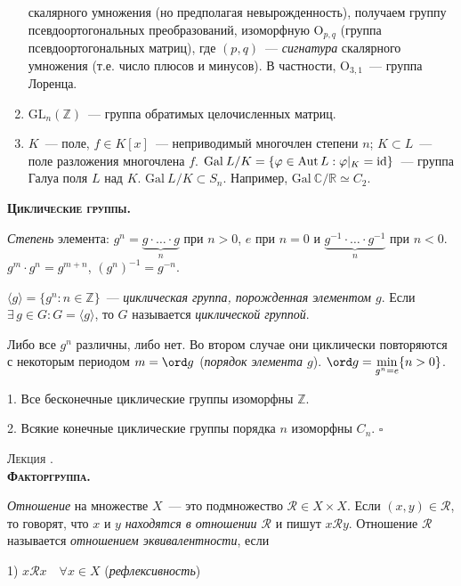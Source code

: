 \documentclass[a4paper]{article}
\newcounter{lec}
\renewcommand{\thelec}{\Roman{lec}}
\newcommand*{\lecture}[1]{\refstepcounter{lec}\vspace{20pt}
\begin{center}{\rmfamily\textsc{Лекция \thelec. \\ \textbf{#1}}}\vspace{5pt}
\end{center}}
\newcommand*{\tema}[1]{\vspace{20pt}
\begin{center}{\textbf{\textsc{#1.}}}\vspace{5pt}
\end{center}}
\renewcommand{\Aut}{\mathop{\mathrm{Aut}}\nolimits}
\newcommand*{\p}[1]{#1\nobreak\discretionary{}{\hbox{$\mathsurround=0pt #1$}}{}}
\begin{document}
\begin{ex}
\begin{enumerate}
  скалярного умножения (но предполагая невырожденность), получаем
  группу псевдоортогональных преобразований, изоморфную $\mathrm{O}_{p,q}$ (группа
  псевдоортогональных матриц), где $(p,q)$~--- \emph{сигнатура}
  скалярного умножения (т.е. число плюсов и минусов). В частности,
  $\mathrm{O}_{3,1}$~--- группа Лоренца.
  \item $\mathrm{\mathrm{GL}}_n(\mathbb{Z})$~--- группа обратимых целочисленных
  матриц.
  \item $K$~--- поле, $f\in K[x]$~--- неприводимый многочлен степени
  $n$; $K\subset L$~--- поле разложения многочлена $f$. $\mathrm{Gal}\: L/K=
  \{\varphi\in \Aut L: \varphi|_K\p=\mathrm{id}\}$~--- группа Галуа поля $L$
  над $K$. $\mathrm{Gal}\: L/K\subset S_n$. Например, $\mathrm{Gal}\: \mathbb{C}/\mathbb{R}
  \simeq C_2$.
\end{enumerate}
\end{ex}
\tema{Циклические группы}

\emph{Степень} элемента: $g^n=\underbrace{g\cdot\ldots\cdot g}_{n}$
при $n>0$, $e$ при $n=0$ и $\underbrace{g^{-1}\cdot\ldots\cdot
g^{-1}}_{n}$ при $n<0$. $g^m\cdot g^n=g^{m+n}$, $(g^n)^{-1}=g^{-n}$.

$\langle g\rangle=\{g^n: n\in \mathbb{Z}\}$~--- \emph{циклическая
группа, порожденная элементом $g$}. Если $\exists \, g\in G:
G=\langle g\rangle$, то $G$ называется \emph{циклической группой}.

Либо все $g^n$ различны, либо нет. Во втором случае они циклически
повторяются с некоторым периодом $m=\ord g$ (\emph{порядок элемента
$g$}). $\ord g=\min\limits_{g^n=e}\{n\p>0\}$.

\begin{theorem}
1. Все бесконечные циклические группы изоморфны $\mathbb{Z}$.

2. Всякие конечные циклические группы порядка $n$ изоморфны $C_n$.
$\square$
\end{theorem}
\lecture{Факторгруппа.}

\emph{Отношение} на множестве $X$~--- это подмножество
$\mathcal{R}\in X\times X$. Если $(x,y)\in \mathcal{R}$, то говорят,
что $x$ и $y$ \emph{находятся в отношении $\mathcal{R}$} и пишут
$x\mathcal{R}y$. Отношение $\mathcal{R}$ называется \emph{отношением
эквивалентности}, если

1) $x\mathcal{R}x\quad \forall x\in X$ \quad (\emph{рефлексивность})
\end{document}
